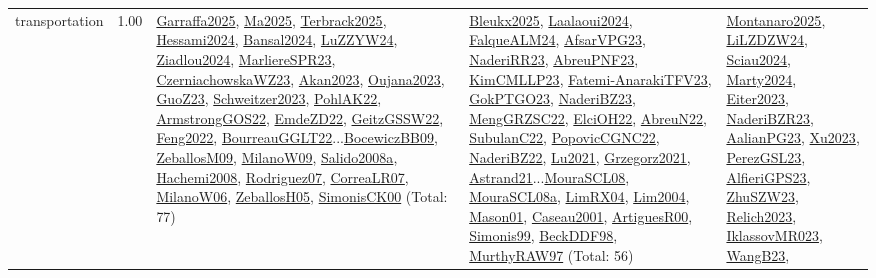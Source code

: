 {\begin{longtable}{p{3cm}r>{\raggedright\arraybackslash}p{6cm}>{\raggedright\arraybackslash}p{6cm}>{\raggedright\arraybackslash}p{8cm}}
\index{transportation}\index{Concepts!transportation}transportation &  1.00 & \hyperref[detail:Garraffa2025]{Garraffa2025}, \hyperref[detail:Ma2025]{Ma2025}, \hyperref[detail:Terbrack2025]{Terbrack2025}, \hyperref[detail:Hessami2024]{Hessami2024}, \hyperref[detail:Bansal2024]{Bansal2024}, \hyperref[detail:LuZZYW24]{LuZZYW24}, \hyperref[detail:Ziadlou2024]{Ziadlou2024}, \hyperref[detail:MarliereSPR23]{MarliereSPR23}, \hyperref[detail:CzerniachowskaWZ23]{CzerniachowskaWZ23}, \hyperref[detail:Akan2023]{Akan2023}, \hyperref[detail:Oujana2023]{Oujana2023}, \hyperref[detail:GuoZ23]{GuoZ23}, \hyperref[detail:Schweitzer2023]{Schweitzer2023}, \hyperref[detail:PohlAK22]{PohlAK22}, \hyperref[detail:ArmstrongGOS22]{ArmstrongGOS22}, \hyperref[detail:EmdeZD22]{EmdeZD22}, \hyperref[detail:GeitzGSSW22]{GeitzGSSW22}, \hyperref[detail:Feng2022]{Feng2022}, \hyperref[detail:BourreauGGLT22]{BourreauGGLT22}...\hyperref[detail:BocewiczBB09]{BocewiczBB09}, \hyperref[detail:ZeballosM09]{ZeballosM09}, \hyperref[detail:MilanoW09]{MilanoW09}, \hyperref[detail:Salido2008a]{Salido2008a}, \hyperref[detail:Hachemi2008]{Hachemi2008}, \hyperref[detail:Rodriguez07]{Rodriguez07}, \hyperref[detail:CorreaLR07]{CorreaLR07}, \hyperref[detail:MilanoW06]{MilanoW06}, \hyperref[detail:ZeballosH05]{ZeballosH05}, \hyperref[detail:SimonisCK00]{SimonisCK00} (Total: 77) & \hyperref[detail:Bleukx2025]{Bleukx2025}, \hyperref[detail:Laalaoui2024]{Laalaoui2024}, \hyperref[detail:FalqueALM24]{FalqueALM24}, \hyperref[detail:AfsarVPG23]{AfsarVPG23}, \hyperref[detail:NaderiRR23]{NaderiRR23}, \hyperref[detail:AbreuPNF23]{AbreuPNF23}, \hyperref[detail:KimCMLLP23]{KimCMLLP23}, \hyperref[detail:Fatemi-AnarakiTFV23]{Fatemi-AnarakiTFV23}, \hyperref[detail:GokPTGO23]{GokPTGO23}, \hyperref[detail:NaderiBZ23]{NaderiBZ23}, \hyperref[detail:MengGRZSC22]{MengGRZSC22}, \hyperref[detail:ElciOH22]{ElciOH22}, \hyperref[detail:AbreuN22]{AbreuN22}, \hyperref[detail:SubulanC22]{SubulanC22}, \hyperref[detail:PopovicCGNC22]{PopovicCGNC22}, \hyperref[detail:NaderiBZ22]{NaderiBZ22}, \hyperref[detail:Lu2021]{Lu2021}, \hyperref[detail:Grzegorz2021]{Grzegorz2021}, \hyperref[detail:Astrand21]{Astrand21}...\hyperref[detail:MouraSCL08]{MouraSCL08}, \hyperref[detail:MouraSCL08a]{MouraSCL08a}, \hyperref[detail:LimRX04]{LimRX04}, \hyperref[detail:Lim2004]{Lim2004}, \hyperref[detail:Mason01]{Mason01}, \hyperref[detail:Caseau2001]{Caseau2001}, \hyperref[detail:ArtiguesR00]{ArtiguesR00}, \hyperref[detail:Simonis99]{Simonis99}, \hyperref[detail:BeckDDF98]{BeckDDF98}, \hyperref[detail:MurthyRAW97]{MurthyRAW97} (Total: 56) & \hyperref[detail:Montanaro2025]{Montanaro2025}, \hyperref[detail:LiLZDZW24]{LiLZDZW24}, \hyperref[detail:Sciau2024]{Sciau2024}, \hyperref[detail:Marty2024]{Marty2024}, \hyperref[detail:Eiter2023]{Eiter2023}, \hyperref[detail:NaderiBZR23]{NaderiBZR23}, \hyperref[detail:AalianPG23]{AalianPG23}, \hyperref[detail:Xu2023]{Xu2023}, \hyperref[detail:PerezGSL23]{PerezGSL23}, \hyperref[detail:AlfieriGPS23]{AlfieriGPS23}, \hyperref[detail:ZhuSZW23]{ZhuSZW23}, \hyperref[detail:Relich2023]{Relich2023}, \hyperref[detail:IklassovMR023]{IklassovMR023}, \hyperref[detail:WangB23]{WangB23}, 
\end{longtable}}
